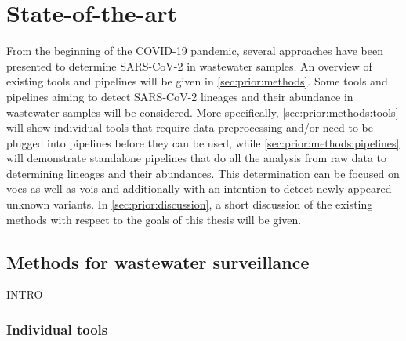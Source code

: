 %
\section{State-of-the-art}

From the beginning of the COVID-19 pandemic, several approaches have been presented to determine SARS-CoV-2 in wastewater samples. An overview of existing tools and pipelines will be given in \autoref{sec:prior:methods}. Some tools and pipelines aiming to detect SARS-CoV-2 lineages and their abundance in wastewater samples will be considered. More specifically, \autoref{sec:prior:methods:tools} will show individual tools that require data preprocessing and/or need to be plugged into pipelines before they can be used, while \autoref{sec:prior:methods:pipelines} will demonstrate standalone pipelines that do all the analysis from raw data to determining lineages and their abundances. This determination can be focused on \acrfull{vocs} as well as \acrfull{vois} and additionally with an intention to detect newly appeared unknown variants. In \autoref{sec:prior:discussion}, a short discussion of the existing methods with respect to the goals of this thesis will be given.

    \subsection{Methods for wastewater surveillance} \label{sec:prior:methods}
    
    INTRO
    
        \subsubsection{Individual tools} \label{sec:prior:methods:tools}

